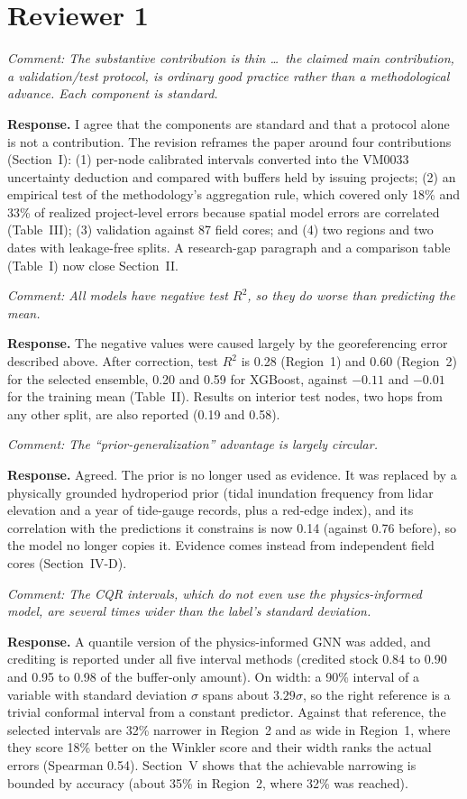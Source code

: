 \documentclass[10pt]{article}
\newcommand{\rc}[1]{\par\textit{Comment: #1}\par}
\newcommand{\resp}{\textbf{Response.} }
\begin{document}
\section*{Reviewer 1}

\rc{The substantive contribution is thin \dots\ the claimed main contribution, a validation/test protocol, is ordinary good practice rather than a methodological advance. Each component is standard.}
\resp I agree that the components are standard and that a protocol alone is not a contribution. The revision reframes the paper around four contributions (Section~I): (1) per-node calibrated intervals converted into the VM0033 uncertainty deduction and compared with buffers held by issuing projects; (2) an empirical test of the methodology's aggregation rule, which covered only 18\% and 33\% of realized project-level errors because spatial model errors are correlated (Table~III); (3) validation against 87 field cores; and (4) two regions and two dates with leakage-free splits. A research-gap paragraph and a comparison table (Table~I) now close Section~II.

\rc{All models have negative test $R^2$, so they do worse than predicting the mean.}
\resp The negative values were caused largely by the georeferencing error described above. After correction, test $R^2$ is 0.28 (Region~1) and 0.60 (Region~2) for the selected ensemble, 0.20 and 0.59 for XGBoost, against $-0.11$ and $-0.01$ for the training mean (Table~II). Results on interior test nodes, two hops from any other split, are also reported (0.19 and 0.58).

\rc{The ``prior-generalization'' advantage is largely circular.}
\resp Agreed. The prior is no longer used as evidence. It was replaced by a physically grounded hydroperiod prior (tidal inundation frequency from lidar elevation and a year of tide-gauge records, plus a red-edge index), and its correlation with the predictions it constrains is now 0.14 (against 0.76 before), so the model no longer copies it. Evidence comes instead from independent field cores (Section~IV-D).

\rc{The CQR intervals, which do not even use the physics-informed model, are several times wider than the label's standard deviation.}
\resp A quantile version of the physics-informed GNN was added, and crediting is reported under all five interval methods (credited stock 0.84 to 0.90 and 0.95 to 0.98 of the buffer-only amount). On width: a 90\% interval of a variable with standard deviation $\sigma$ spans about $3.29\sigma$, so the right reference is a trivial conformal interval from a constant predictor. Against that reference, the selected intervals are 32\% narrower in Region~2 and as wide in Region~1, where they score 18\% better on the Winkler score and their width ranks the actual errors (Spearman 0.54). Section~V shows that the achievable narrowing is bounded by accuracy (about 35\% in Region~2, where 32\% was reached).
\end{document}
